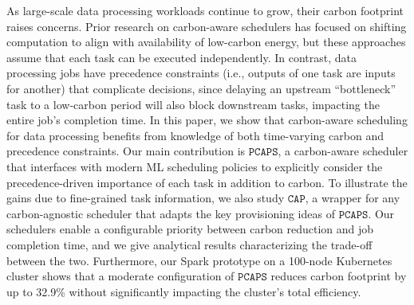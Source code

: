

As large-scale data processing workloads continue to grow, their carbon footprint raises concerns. Prior research on carbon-aware schedulers has focused on shifting computation to align with availability of low-carbon energy, but these approaches assume that each task can be executed independently. 
In contrast, data processing jobs have precedence constraints (i.e., outputs of one task are inputs for another) that complicate decisions, since delaying an upstream ``bottleneck'' task to a low-carbon period will also block downstream tasks, impacting the entire job's completion time. 
In this paper, we show that carbon-aware scheduling for data processing benefits from knowledge of both time-varying carbon and precedence constraints. 
Our main contribution is $\texttt{PCAPS}$, a carbon-aware scheduler that interfaces with modern ML scheduling policies to explicitly consider the precedence-driven importance of  each task in addition to carbon.  
To illustrate the gains due to fine-grained task information, we also study $\texttt{CAP}$, a wrapper for any carbon-agnostic scheduler that adapts the key provisioning ideas of $\texttt{PCAPS}$.
Our schedulers enable a configurable priority between carbon reduction and job completion time, and we give analytical results characterizing the trade-off between the two.
Furthermore, our Spark prototype on a 100-node Kubernetes cluster shows that a moderate configuration of $\texttt{PCAPS}$ reduces carbon footprint by up to 32.9\% without significantly impacting the cluster's total efficiency.







